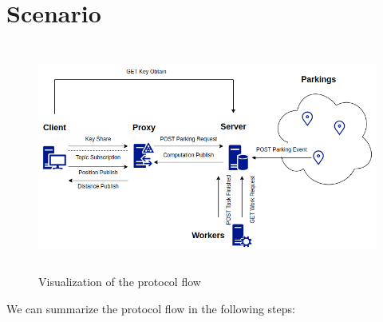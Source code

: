 \documentclass[12pt,a4paper,twoside]{book}
\begin{document}
\newpage
\section{Scenario}
\begin{figure}[h]
    \centering
    \includegraphics[width=12cm,height=7.5cm]{img/workflow.png}
    \caption{Visualization of the protocol flow}
    \label{fig:protocol-flow}
\end{figure}

We can summarize the protocol flow in the following steps:
\end{document}
